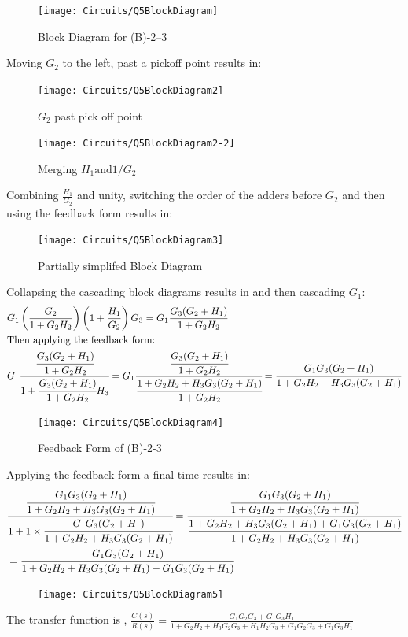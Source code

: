 \documentclass[12pt]{article}
\newenvironment{problem}[2][Problem]{\begin{trivlist}
		\item[\hskip \labelsep {\bfseries #1}\hskip \labelsep {\bfseries #2.}]}{\end{trivlist}}
\begin{document}
\begin{problem}{5 --- (B)-2-3 --- obtain transfer function} \hfill\newline
	
\begin{figure}[H]
	\centering
	\texttt{[image: Circuits/Q5BlockDiagram]}
	\caption{Block Diagram for (B)-2--3}
	\label{fig:q5blockdiagram}
\end{figure}
Moving $G_2$ to the left, past a pickoff point results in:
\begin{figure}[H]
	\centering
	\begin{minipage}{.5\textwidth}
		\centering
		\texttt{[image: Circuits/Q5BlockDiagram2]}
		\caption{$G_2$ past pick off point}
		\label{fig:prob1_6_2}
	\end{minipage}%
	\begin{minipage}{0.5\textwidth}
		\centering
		\texttt{[image: Circuits/Q5BlockDiagram2-2]}
		\caption{Merging $ H_1 \text{and} 1 / G_2$}
		\label{fig:prob1_6_1}
	\end{minipage}
\end{figure}
Combining $\frac{H_1}{G_2}$ and unity, switching the order of the adders before $G_2$ and then using the feedback form results in:
\begin{figure}[H]
	\centering
	\texttt{[image: Circuits/Q5BlockDiagram3]}
	\caption{Partially simplifed Block Diagram}
	\label{fig:q5blockdiagram3}
\end{figure}
Collapsing the cascading block diagrams results in and then cascading $G_1$:
\begin{align*}
& G_1\left(\frac{G_2}{1+G_2H_2}\right)\left(1+\frac{H_1}{G_2}\right)G_3=G_1\frac{G_3(G_2+H_1)}{1+G_2H_2} \\
& \text{Then applying the feedback form:} \\ 
& G_1\cfrac{\cfrac{G_3(G_2+H_1)}{1+G_2H_2}}{1+\cfrac{G_3(G_2+H_1)}{1+G_2H_2}H_3}= G_1\cfrac{\cfrac{G_3(G_2+H_1)}{1+G_2H_2}}{\cfrac{1+G_2H_2+H_3G_3(G_2+H_1)}{1+G_2H_2}}= \cfrac{G_1G_3(G_2+H_1)}{1+G_2H_2+H_3G_3(G_2+H_1)}
\end{align*}
\begin{figure}[H]
	\centering
	\texttt{[image: Circuits/Q5BlockDiagram4]}
	\caption{Feedback Form of (B)-2-3}
	\label{fig:q5blockdiagram4}
\end{figure}
Applying the feedback form a final time results in:
\begin{align*}
& \cfrac{\cfrac{G_1G_3(G_2+H_1)}{1+G_2H_2+H_3G_3(G_2+H_1)}}{1+1\times\cfrac{G_1G_3(G_2+H_1)}{1+G_2H_2+H_3G_3(G_2+H_1)}}= \cfrac{\cfrac{G_1G_3(G_2+H_1)}{1+G_2H_2+H_3G_3(G_2+H_1)}}{\cfrac{1+G_2H_2+H_3G_3(G_2+H_1)+G_1G_3(G_2+H_1)}{1+G_2H_2+H_3G_3(G_2+H_1)}} \\
&= \cfrac{G_1G_3(G_2+H_1)}{1+G_2H_2+H_3G_3(G_2+H_1)+G_1G_3(G_2+H_1)}
\end{align*}
\begin{figure}[H]
	\centering
	\texttt{[image: Circuits/Q5BlockDiagram5]}
\end{figure}
The transfer function is , $\displaystyle \boxed{\frac{C(s)}{R(s)}= \frac{G_1G_2G_3+G_1G_3H_1}{1+G_2H_2+H_3G_2G_3+H_1H_2G_3+G_1G_2G_3+G_1G_3H_1}}$
\end{problem}
\end{document}

